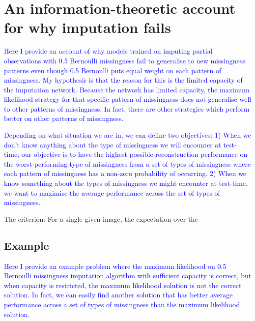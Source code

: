 \documentclass[a4paper,12pt,twoside,openright]{article}
\newcommand{\draft}[1]{\textcolor{blue}{#1}}
\begin{document}


\section{An information-theoretic account for why imputation fails}

\draft{Here I provide an account of why models trained on imputing partial observations with 0.5 Bernoulli missingness fail to generalise to new missingness patterns even though 0.5 Bernoulli puts equal weight on each pattern of missingness. My hypothesis is that the reason for this is the limited capacity of the imputation network. Because the network has limited capacity, the maximum likelihood strategy for that specific pattern of missingness does not generalise well to other patterns of missingness. In fact, there are other strategies which perform better on other patterns of missingness.}

\draft{Depending on what situation we are in, we can define two objectives: 1) When we don't know anything about the type of missingness we will encounter at test-time, our objective is to have the highest possible reconstruction performance on the worst-performing type of missingness from a set of types of missingness where each pattern of missingness has a non-zero probability of occurring. 2) When we know something about the types of missingness we might encounter at test-time, we want to maximise the average performance across the set of types of missingness.}

The criterion: For a single given image, the expectation over the 

\subsection{Example}

\draft{Here I provide an example problem where the maximum likelihood on 0.5 Bernoulli missingness imputation algorithm with sufficient capacity is correct, but when capacity is restricted, the maximum likelihood solution is not the correct solution. In fact, we can easily find another solution that has better average performance across a set of types of missingness than the maximum likelihood solution.}
\end{document}
